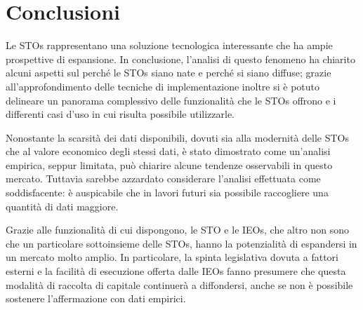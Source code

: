\chapter*{Conclusioni}

Le STOs  rappresentano  una soluzione tecnologica interessante che ha ampie prospettive di espansione. In conclusione, l'analisi di questo fenomeno ha chiarito alcuni aspetti sul perché le STOs siano nate e perché si siano diffuse; grazie all'approfondimento delle tecniche di implementazione inoltre si è potuto delineare un panorama complessivo delle funzionalità che le STOs offrono e i differenti casi d'uso in cui risulta possibile utilizzarle. 

Nonostante la scarsità dei dati disponibili, dovuti sia alla modernità delle STOs che al valore economico degli stessi dati, è stato dimostrato come un'analisi empirica, seppur limitata, può chiarire alcune tendenze osservabili in questo mercato. Tuttavia sarebbe azzardato considerare l'analisi effettuata come soddisfacente: è auspicabile che in lavori futuri sia possibile raccogliere una quantità di dati maggiore. 

Grazie alle funzionalità di cui dispongono, le STO e le IEOs, che altro non sono che un particolare sottoinsieme delle STOs, hanno la potenzialità di espandersi in un mercato molto amplio. In particolare, la spinta legislativa dovuta a fattori esterni e la facilità di esecuzione offerta dalle IEOs fanno presumere che questa modalità di raccolta di capitale continuerà a diffondersi, anche se non è possibile sostenere l'affermazione con dati empirici. 